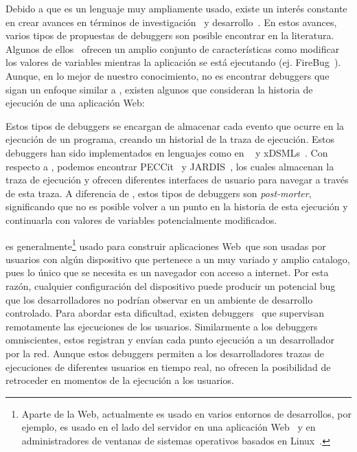 \documentclass[conference]{IEEEtran}
\begin{document}
Debido a que \javascript es un lenguaje muy ampliamente usado, existe un inter\'es constante en crear avances en t\'erminos de investigaci\'on~\cite{vazquesAl:ist2018,legerAl:scp2013,legerAl:scp2015,zhengAl:www2011,chargueraudAl:www2018} y desarrollo~\cite{resig:jquery,angular,mckenzie:babel,rxjs}. En estos avances, varios tipos de propuestas de debuggers son posible encontrar en la literatura. Algunos de ellos~\cite{bartonOdvarko:www2011,jsbin,nodejsInspector} ofrecen un amplio conjunto de caracter\'isticas como modificar los valores de variables mientras la aplicaci\'on se est\'a ejecutando (ej. FireBug~\cite{bartonOdvarko:www2011}). Aunque, en lo mejor de nuestro conocimiento, no es encontrar debuggers que sigan un enfoque similar a \deloreanjs, existen algunos que consideran la historia de ejecuci\'on de una aplicaci\'on Web:       

\smallskip

 Estos tipos de debuggers se encargan de almacenar cada evento que ocurre en la ejecuci\'on de un programa, creando un historial de la traza de ejecuci\'on. Estos debuggers han sido implementados en lenguajes como en \java~\cite{tod:oopsla2007} y xDSMLs~\cite{bousseAl:SLE2015}. Con respecto a  \javascript, podemos encontrar PECCit~\cite{azar:2016} y JARDIS~\cite{barrAl:fse2016}, los cuales almacenan la traza de ejecuci\'on y ofrecen diferentes interfaces de usuario para navegar a trav\'es de esta traza. A diferencia de \deloreanjs, estos tipos de debuggers son {\em post-morter}, significando que no es posible volver a un punto en la historia de esta ejecuci\'on y continuarla con valores de variables potencialmente modificados. 

\smallskip

 \javascript es generalmente\footnote{Aparte de la Web, \javascript actualmente es usado en varios entornos de desarrollos, por ejemplo, es usado en el lado del servidor en una aplicaci\'on Web~\cite{nodejs:2018} y en administradores de ventanas de sistemas operativos basados en Linux~\cite{gjs}.} usado para construir aplicaciones Web\ que son usadas por usuarios con alg\'un dispositivo que pertenece a un muy variado y amplio catalogo, pues lo \'unico que se necesita es un navegador con acceso a internet. Por esta raz\'on, cualquier configuraci\'on del dispositivo puede producir un potencial bug que los desarrolladores no podr\'ian observar en un ambiente de desarrollo controlado. Para abordar esta dificultad, existen debuggers~\cite{sessionstack,raygun,trackjs} que supervisan remotamente las ejecuciones de los usuarios. Similarmente a los debuggers omniscientes, estos registran y env\'ian cada punto ejecuci\'on a un desarrollador por la red. Aunque estos debuggers permiten a los desarrolladores trazas de ejecuciones de diferentes usuarios en tiempo real, no ofrecen la posibilidad de retroceder en momentos de la ejecuci\'on a los usuarios.   
\end{document}
